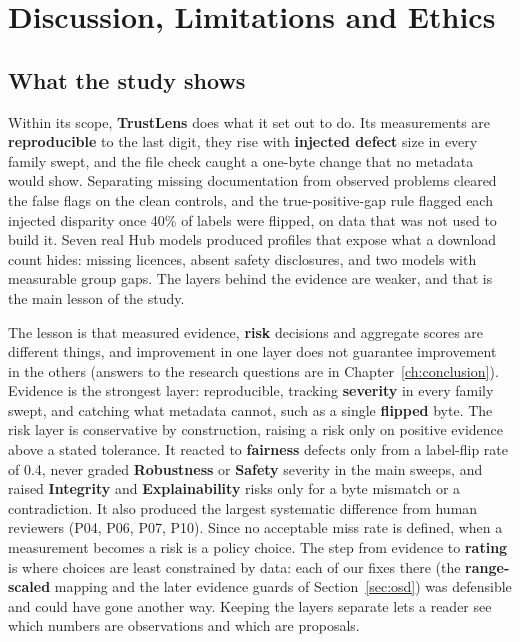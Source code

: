 \chapter{Discussion, Limitations and Ethics}\label{ch:discussion}

\section{What the study shows}
Within its scope, \textbf{TrustLens} does what it set out to do. Its measurements are \textbf{reproducible} to the last digit, they rise with \textbf{injected defect} size in every family swept, and the file check caught a one-byte change that no metadata would show. Separating missing documentation from observed problems cleared the false flags on the clean controls, and the true-positive-gap rule flagged each injected disparity once 40\% of labels were flipped, on data that was not used to build it. Seven real Hub models produced profiles that expose what a download count hides: missing licences, absent safety disclosures, and two models with measurable group gaps. The layers behind the evidence are weaker, and that is the main lesson of the study.

The lesson is that measured evidence, \textbf{risk} decisions and aggregate scores are different things, and improvement in one layer does not guarantee improvement in the others (answers to the research questions are in Chapter~\ref{ch:conclusion}). Evidence is the strongest layer: reproducible, tracking \textbf{severity} in every family swept, and catching what metadata cannot, such as a single \textbf{flipped} byte. The risk layer is conservative by construction, raising a risk only on positive evidence above a stated tolerance. It reacted to \textbf{fairness} defects only from a label-flip rate of 0.4, never graded \textbf{Robustness} or \textbf{Safety} severity in the main sweeps, and raised \textbf{Integrity} and \textbf{Explainability} risks only for a byte mismatch or a contradiction. It also produced the largest systematic difference from human reviewers (P04, P06, P07, P10). Since no acceptable miss rate is defined, when a measurement becomes a risk is a policy choice. The step from evidence to \textbf{rating} is where choices are least constrained by data: each of our fixes there (the \textbf{range-scaled} mapping and the later evidence guards of Section~\ref{sec:osd}) was defensible and could have gone another way. Keeping the layers separate lets a reader see which numbers are observations and which are proposals.

